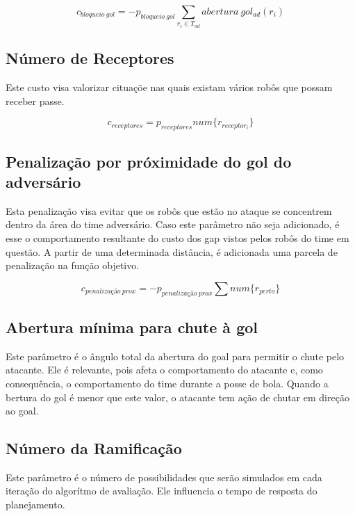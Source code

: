 \begin{dmath}
   c_{bloqueio{\ }gol} = - p_{bloqueio{\ }gol}
    \sum_{r_i \in T_{ad}} abertura{\ }gol_{ad}(r_i)
\end{dmath}

\subsection{Número de Receptores}

Este custo visa valorizar cituaçõe nas quais existam
vários robôs que possam receber passe.

\begin{dmath}
  c_{receptores} = p_{receptores}
   num \lbrace r_{receptor_i} \rbrace
\end{dmath}

\subsection{Penalização por próximidade do gol do adversário}
Esta penalização visa evitar que os robôs que estão no ataque
se concentrem dentro da área do time adversário. Caso este
parâmetro não seja adicionado, é esse o comportamento resultante
do custo dos gap vistos pelos robôs do time em questão. 
A partir de uma determinada distância, é adicionada uma parcela
de penalização na função objetivo.

\begin{dmath}
  c_{penalização{\ }prox} = - p_{penalização{\ }prox}
    \sum num \lbrace r_{perto} \rbrace
\end{dmath}

\subsection{Abertura mínima para chute à gol}
Este parâmetro é o ângulo total da abertura do goal para permitir
o chute pelo atacante. Ele é relevante, pois afeta o comportamento
do atacante e, como consequência, o comportamento do time durante
a posse de bola. Quando a bertura do gol é menor que este valor, o
atacante tem ação de chutar em direção ao goal.


\subsection{Número da Ramificação}
Este parâmetro é o número de possibilidades que serão simulados
em cada iteração do algorítmo de avaliação. Ele influencia o
tempo de resposta do planejamento.
